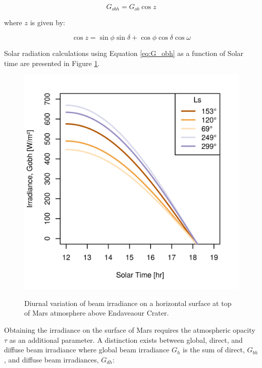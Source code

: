 \begin{equation}
  \label{eq:G_obh}
  G_{obh} = G_{ob}\cos{z}
\end{equation}

where $z$ is given by:

\begin{equation}
  \label{eq:cosz}
  \cos{z} = \sin{\phi}\sin{\delta} + \cos{\phi}\cos{\delta}\cos{\omega}
\end{equation}

Solar radiation calculations using Equation \ref{eq:G_obh} as a function of Solar time are presented in Figure \ref{fig:plot:diurnal-variation-of-beam-irradiance-on-a-horizontal-surface-at-top-of-mars-atmosphere}.

\begin{figure}[h]
  \centering
  \hypersetup{linkcolor=captionTextColor}
  \includegraphics[width=0.5\linewidth]{sections/mars-solar-energy/solar-radiation/plots/gobh-diurnal-over-endaveaour-crater.png}\\
  \caption[Diurnal variation of beam irradiance on a horizontal surface at top of Mars atmosphere above Endaveaour Crater]
  {Diurnal variation of beam irradiance on a horizontal surface at top of Mars atmosphere above Endaveaour Crater.}
  \label{fig:plot:diurnal-variation-of-beam-irradiance-on-a-horizontal-surface-at-top-of-mars-atmosphere}
\end{figure}

Obtaining the irradiance on the surface of Mars requires the atmospheric opacity $\tau$ as an additional parameter. A distinction exists between global, direct, and diffuse beam irradiance where global beam irradiance $G_{h}$ is the sum of direct, $G_{bh}$, and diffuse beam irradiances, $G_{dh}$:




